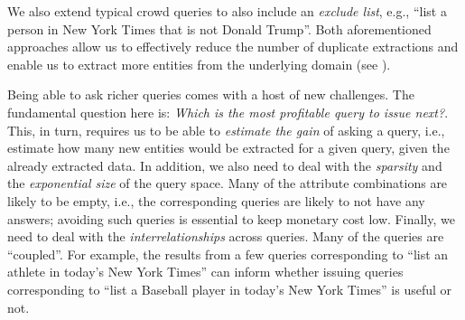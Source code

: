 We also extend typical crowd queries to also include an {\em exclude list}, e.g., ``list a person in New York Times that is not Donald Trump''. Both aforementioned approaches allow us to effectively reduce the number of duplicate extractions and enable us to extract more entities from the underlying domain (see ).

Being able to ask richer queries comes with a host of new challenges. The fundamental question here is: {\em Which is the most profitable query to issue next?}. This, in turn, requires us to be able to {\em estimate the gain} of asking a query, i.e., estimate how many new entities would be extracted for a given query, given the already extracted data. In addition, we also need to deal with the {\em sparsity} and the {\em exponential size} of the query space. Many of the attribute combinations are likely to be empty, i.e., the corresponding queries are likely to not have any answers; avoiding such queries is essential to keep monetary cost low. Finally, we need to deal with the {\em interrelationships} across queries. Many of the queries are ``coupled''. For example, the results from a few queries corresponding to ``list an athlete in today's New York Times'' can inform whether issuing queries corresponding to ``list a Baseball player in today's New York Times'' is useful or not. 

